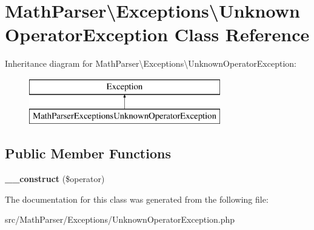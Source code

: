 \hypertarget{classMathParser_1_1Exceptions_1_1UnknownOperatorException}{\section{Math\-Parser\textbackslash{}Exceptions\textbackslash{}Unknown\-Operator\-Exception Class Reference}
\label{classMathParser_1_1Exceptions_1_1UnknownOperatorException}
}
Inheritance diagram for Math\-Parser\textbackslash{}Exceptions\textbackslash{}Unknown\-Operator\-Exception\-:\begin{figure}[H]
\begin{center}
\leavevmode
\includegraphics[height=2.000000cm]{classMathParser_1_1Exceptions_1_1UnknownOperatorException}
\end{center}
\end{figure}
\subsection*{Public Member Functions}
\begin{DoxyCompactItemize}
\item 
\hypertarget{classMathParser_1_1Exceptions_1_1UnknownOperatorException_aba135a16c12fbdb536f06b1a16a8c06c}{{\bfseries \-\_\-\-\_\-construct} (\$operator)}\label{classMathParser_1_1Exceptions_1_1UnknownOperatorException_aba135a16c12fbdb536f06b1a16a8c06c}

\end{DoxyCompactItemize}


The documentation for this class was generated from the following file\-:\begin{DoxyCompactItemize}
\item 
src/\-Math\-Parser/\-Exceptions/Unknown\-Operator\-Exception.\-php\end{DoxyCompactItemize}
